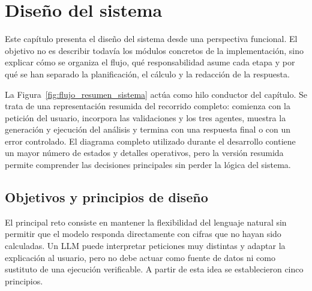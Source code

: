 \chapter{Diseño del sistema}

Este capítulo presenta el diseño del sistema desde una perspectiva funcional. El objetivo no es describir todavía los módulos concretos de la implementación, sino explicar cómo se organiza el flujo, qué responsabilidad asume cada etapa y por qué se han separado la planificación, el cálculo y la redacción de la respuesta.

La Figura~\ref{fig:flujo_resumen_sistema} actúa como hilo conductor del capítulo. Se trata de una representación resumida del recorrido completo: comienza con la petición del usuario, incorpora las validaciones y los tres agentes, muestra la generación y ejecución del análisis y termina con una respuesta final o con un error controlado. El diagrama completo utilizado durante el desarrollo contiene un mayor número de estados y detalles operativos, pero la versión resumida permite comprender las decisiones principales sin perder la lógica del sistema.

\section{Objetivos y principios de diseño}

El principal reto consiste en mantener la flexibilidad del lenguaje natural sin permitir que el modelo responda directamente con cifras que no hayan sido calculadas. Un LLM puede interpretar peticiones muy distintas y adaptar la explicación al usuario, pero no debe actuar como fuente de datos ni como sustituto de una ejecución verificable. A partir de esta idea se establecieron cinco principios.

